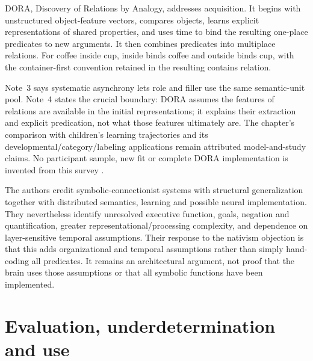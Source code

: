 DORA, Discovery of Relations by Analogy, addresses acquisition.
It begins with unstructured object-feature vectors, compares objects,
learns explicit representations of shared properties, and uses time
to bind the resulting one-place predicates to new arguments. It then
combines predicates into multiplace relations. For coffee inside cup,
inside binds coffee and outside binds cup, with the container-first
convention retained in the resulting contains relation.

Note~3 says systematic asynchrony lets role and filler use the same
semantic-unit pool. Note~4 states the crucial boundary: DORA assumes
the features of relations are available in the initial representations;
it explains their extraction and explicit predication, not what those
features ultimately are. The chapter's comparison with children's
learning trajectories and its developmental/category/labeling applications
remain attributed model-and-study claims. No participant sample,
new fit or complete DORA implementation is invented from this survey
\parencite[pp.~61--64, especially nn.~3--4]{DoumasHummel2012HigherCognition}.

The authors credit symbolic-connectionist systems with structural
generalization together with distributed semantics, learning and
possible neural implementation. They nevertheless identify unresolved
executive function, goals, negation and quantification, greater
representational/processing complexity, and dependence on layer-sensitive
temporal assumptions. Their response to the nativism objection is that
this adds organizational and temporal assumptions rather than simply
hand-coding all predicates. It remains an architectural argument, not
proof that the brain uses those assumptions or that all symbolic
functions have been implemented.

\section{Evaluation, underdetermination and use}
\label{sec:p19-ccm-evaluation}

